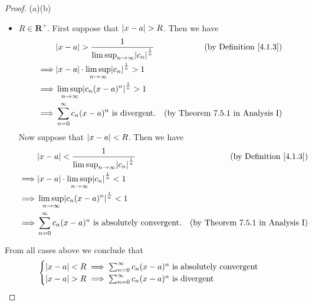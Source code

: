 \begin{proof}{(a)}{(b)}
\begin{itemize}
\begin{align*}
              \end{align*}
        \item \(R \in \mathbf{R}^+\).
              First suppose that \(\abs*{x - a} > R\).
              Then we have
              \begin{align*}
                           & \abs*{x - a} > \frac{1}{\limsup_{n \to \infty} \abs*{c_n}^{\frac{1}{n}}} & \text{(by Definition \ref{4.1.3})}      \\
                  \implies & \abs*{x - a} \cdot \limsup_{n \to \infty} \abs*{c_n}^{\frac{1}{n}} > 1                                             \\
                  \implies & \limsup_{n \to \infty} \abs*{c_n (x - a)^n}^{\frac{1}{n}} > 1                                                      \\
                  \implies & \sum_{n = 0}^\infty c_n (x - a)^n \text{ is divergent}.                  & \text{(by Theorem 7.5.1 in Analysis I)}
              \end{align*}
              Now suppose that \(\abs*{x - a} < R\).
              Then we have
              \begin{align*}
                           & \abs*{x - a} < \frac{1}{\limsup_{n \to \infty} \abs*{c_n}^{\frac{1}{n}}} & \text{(by Definition \ref{4.1.3})}      \\
                  \implies & \abs*{x - a} \cdot \limsup_{n \to \infty} \abs*{c_n}^{\frac{1}{n}} < 1                                             \\
                  \implies & \limsup_{n \to \infty} \abs*{c_n (x - a)^n}^{\frac{1}{n}} < 1                                                      \\
                  \implies & \sum_{n = 0}^\infty c_n (x - a)^n \text{ is absolutely convergent}.      & \text{(by Theorem 7.5.1 in Analysis I)}
              \end{align*}
    \end{itemize}
    From all cases above we conclude that
    \[
        \begin{cases}
            \abs*{x - a} < R \implies \sum_{n = 0}^\infty c_n (x - a)^n \text{ is absolutely convergent} \\
            \abs*{x - a} > R \implies \sum_{n = 0}^\infty c_n (x - a)^n \text{ is divergent}
        \end{cases}
    \]
\end{proof}


